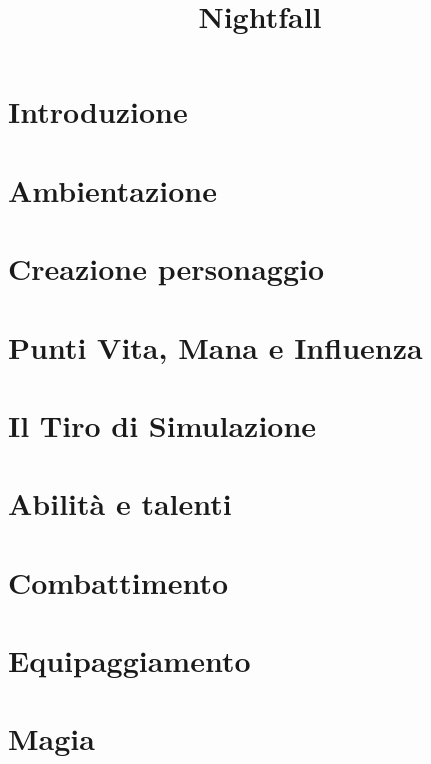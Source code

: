 \documentclass[10pt]{article} %
\title{Nightfall}
\author{}
\date{} %
\begin{document}
 \maketitle

\tableofcontents{}
\cleardoublepage

\section{Introduzione}

\clearpage

\section{Ambientazione}

\clearpage

\section{Creazione personaggio}

\clearpage

\section{Punti Vita, Mana e Influenza}

\clearpage


\section{Il Tiro di Simulazione}

\clearpage 

\section{Abilità e talenti}

\clearpage 


\section{Combattimento}

\clearpage 

\section{Equipaggiamento}

\clearpage 

\section{Magia}

\clearpage 
\end{document}
